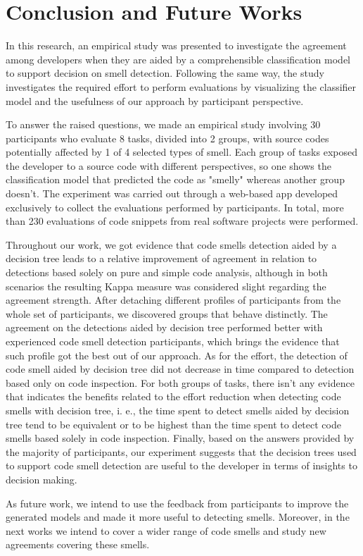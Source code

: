 \chapter{Conclusion and Future Works}
\label{sec:conclusion}

In this research, an empirical study was presented to investigate the agreement among developers when they are aided by a comprehensible classification model to support decision on smell detection. Following the same way, the study investigates the required effort to perform evaluations by visualizing the classifier model and the usefulness of our approach by participant perspective. 

To answer the raised questions, we made an empirical study involving 30 participants who evaluate 8 tasks, divided into 2 groups, with source codes potentially affected by 1 of 4 selected types of smell. Each group of tasks exposed the developer to a source code with different perspectives, so one shows the classification model that predicted the code as "smelly" whereas another group doesn’t.  The experiment was carried out through a web-based app developed exclusively to collect the evaluations performed by participants. In total, more than 230 evaluations of code snippets from real software projects were performed.

Throughout our work, we got evidence that code smells detection aided by a decision tree leads to a relative improvement of agreement in relation to detections based solely on pure and simple code analysis, although in both scenarios the resulting Kappa measure was considered slight regarding the agreement strength. After detaching different profiles of participants from the whole set of participants, we discovered groups that behave distinctly. The agreement on the detections aided by decision tree performed better with experienced code smell detection participants, which brings the evidence that such profile got the best out of our approach. As for the effort, the detection of code smell aided by decision tree did not decrease in time compared to detection based only on code inspection. For both groups of tasks, there isn’t any evidence that indicates the benefits related to the effort reduction when detecting code smells with decision tree, i. e., the time spent to detect smells aided by decision tree tend to  be equivalent or to be highest than  the time spent to detect code smells based solely in code inspection. Finally, based on the answers provided by the majority of participants, our experiment suggests that the decision trees used to support code smell detection are useful to the developer in terms of insights to decision making.

As future work, we intend to use the feedback from participants to improve the generated models and made it more useful to detecting smells. Moreover, in the next works we intend to cover a wider range of code smells and study new agreements covering these smells.


